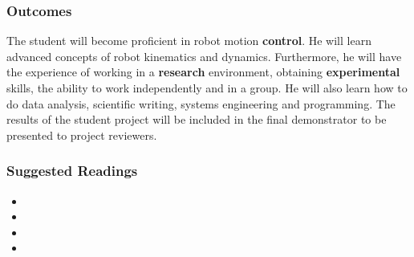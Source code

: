 \subsubsection{Outcomes}
The student will become proficient in robot motion \textbf{control}. He will learn advanced concepts of robot kinematics and dynamics.
Furthermore, he will have the experience of working in a \textbf{research} environment, obtaining \textbf{experimental} skills, the ability to work independently and in a group. He will also learn how to do data analysis, scientific writing, systems engineering and programming.
The results of the student project will be included in the final demonstrator to be presented to project reviewers.

\subsubsection{Suggested Readings}
\begin{itemize}
\item	{}
\item	{}
\item	{}
\item	{}

\end{itemize}
